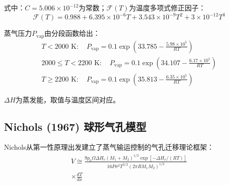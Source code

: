 \noindent 式中：$C = 5.006 \times 10^{-12}$为常数；$\mathcal{F}(T)$为温度多项式修正因子：
\begin{equation}
	\mathcal{F}(T) = 0.988 + 6.395 \times 10^{-6}T + 3.543 \times 10^{-9}T^2 + 3 \times 10^{-12}T^3
	\label{eq:app_b_sens_temperature_factor}
\end{equation}

蒸气压力$P_{\text{vap}}$由分段函数给出：
\begin{equation}
	\begin{gathered}
		T < 2000 \text{ K}: \quad P_{\text{vap}} = 0.1 \exp\left(33.785 - \frac{5.98 \times 10^5}{RT}\right) \\
		2000 \leq T < 2200 \text{ K}: \quad P_{\text{vap}} = 0.1 \exp\left(34.107 - \frac{6.17 \times 10^5}{RT}\right) \\
		T \geq 2200 \text{ K}: \quad P_{\text{vap}} = 0.1 \exp\left(35.813 - \frac{6.35 \times 10^5}{RT}\right)
	\end{gathered}
	\label{eq:app_b_sens_vapor_pressure}
\end{equation}

$\Delta H$为蒸发能，取值与温度区间对应。

\subsection{Nichols (1967) 球形气孔模型}

Nichols从第一性原理出发建立了蒸气输运控制的气孔迁移理论框架：
\begin{equation}
	\begin{gathered}
		V \cong{}
		\frac{9 p_0 \Omega \Delta H_v (M_1 + M_2)^{1/2}
			\exp[-\Delta H_v/(RT)]}
		{16 P \sigma^2 T^{3/2}(2\pi R M_1 M_2)^{1/2}} \\
		\times \frac{dT}{dx}
	\end{gathered}
	\label{eq:app_b_nichols1967_migration_velocity}
\end{equation}

